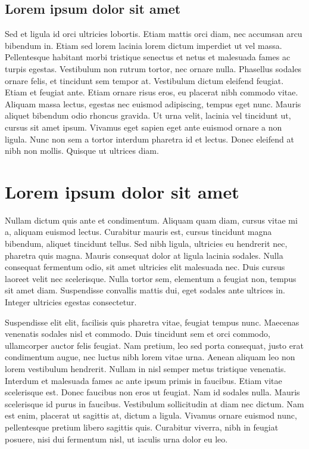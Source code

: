 \documentclass{projetofinal-dcc}
\begin{document}
\subsection{Lorem ipsum dolor sit amet}\label{sec:LABEL_CHP_1_SEC_E}
Sed et ligula id orci ultricies lobortis. Etiam mattis orci diam, nec accumsan arcu bibendum in. Etiam sed lorem lacinia lorem dictum imperdiet ut vel massa. Pellentesque habitant morbi tristique senectus et netus et malesuada fames ac turpis egestas. Vestibulum non rutrum tortor, nec ornare nulla. Phasellus sodales ornare felis, et tincidunt sem tempor at. Vestibulum dictum eleifend feugiat. Etiam et feugiat ante. Etiam ornare risus eros, eu placerat nibh commodo vitae. Aliquam massa lectus, egestas nec euismod adipiscing, tempus eget nunc. Mauris aliquet bibendum odio rhoncus gravida. Ut urna velit, lacinia vel tincidunt ut, cursus sit amet ipsum. Vivamus eget sapien eget ante euismod ornare a non ligula. Nunc non sem a tortor interdum pharetra id et lectus. Donec eleifend at nibh non mollis. Quisque ut ultrices diam.

\section{Lorem ipsum dolor sit amet}\label{sec:LABEL_CHP_1_SEC_F}
Nullam dictum quis ante et condimentum. Aliquam quam diam, cursus vitae mi a, aliquam euismod lectus. Curabitur mauris est, cursus tincidunt magna bibendum, aliquet tincidunt tellus. Sed nibh ligula, ultricies eu hendrerit nec, pharetra quis magna. Mauris consequat dolor at ligula lacinia sodales. Nulla consequat fermentum odio, sit amet ultricies elit malesuada nec. Duis cursus laoreet velit nec scelerisque. Nulla tortor sem, elementum a feugiat non, tempus sit amet diam. Suspendisse convallis mattis dui, eget sodales ante ultrices in. Integer ultricies egestas consectetur.

Suspendisse elit elit, facilisis quis pharetra vitae, feugiat tempus nunc. Maecenas venenatis sodales nisl et commodo. Duis tincidunt sem et orci commodo, ullamcorper auctor felis feugiat. Nam pretium, leo sed porta consequat, justo erat condimentum augue, nec luctus nibh lorem vitae urna. Aenean aliquam leo non lorem vestibulum hendrerit. Nullam in nisl semper metus tristique venenatis. Interdum et malesuada fames ac ante ipsum primis in faucibus. Etiam vitae scelerisque est. Donec faucibus non eros ut feugiat. Nam id sodales nulla. Mauris scelerisque id purus in faucibus. Vestibulum sollicitudin at diam nec dictum. Nam est enim, placerat ut sagittis at, dictum a ligula. Vivamus ornare euismod nunc, pellentesque pretium libero sagittis quis. Curabitur viverra, nibh in feugiat posuere, nisi dui fermentum nisl, ut iaculis urna dolor eu leo.
\end{document}
